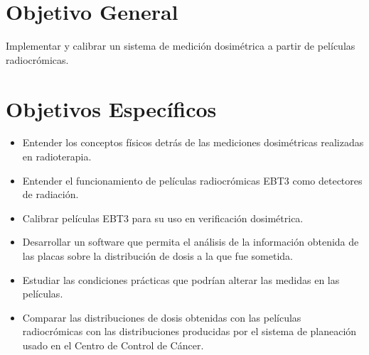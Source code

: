 \section{Objetivo General}


Implementar y calibrar un sistema de medición dosimétrica a partir de películas radiocrómicas.

\section{Objetivos Específicos}


\begin{itemize}
	\item Entender los conceptos físicos detrás de las mediciones dosimétricas realizadas en radioterapia.
	\item Entender el funcionamiento de películas radiocrómicas EBT3 como detectores de radiación.
	\item Calibrar películas EBT3 para su uso en verificación dosimétrica.
	\item Desarrollar un software que permita el análisis de la información obtenida de las placas sobre la distribución de dosis a la que fue sometida.
	\item Estudiar las condiciones prácticas que podrían alterar las medidas en las películas. 
	\item Comparar  las  distribuciones  de  dosis  obtenidas  con  las  películas  radiocrómicas con las distribuciones producidas por el sistema de planeación usado en el Centro de Control de Cáncer.
	
\end{itemize}
